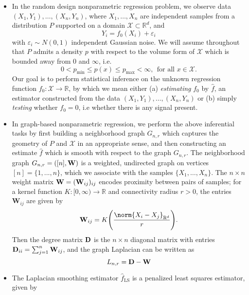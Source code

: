 \documentclass{article}
\newcommand{\Reals}{\mathbb{R}}
\newcommand{\1}{\mathbf{1}}
\newcommand{\Rd}{\Reals^d}
\newcommand{\Lap}{L}
\newcommand{\Xset}{\mathcal{X}}
\newcommand{\mc}[1]{\mathcal{#1}}
\newcommand{\wh}[1]{\widehat{#1}}
\newcommand{\LS}{\mathrm{LS}}
\theoremstyle{alden}
\theoremstyle{aldenthm}
\theoremstyle{definition}
\theoremstyle{remark}
\begin{document}
\begin{itemize}
	\item In the random design nonparametric regression problem, we observe data $(X_1,Y_1),\ldots,(X_n,Y_n)$, where $X_1,\ldots,X_n$ are independent samples from a distribution $P$ supported on a domain $\Xset \subset \Reals^d$, and 
	\begin{equation}
	\label{eqn:random_design_regression}
	Y_i = f_0(X_i) + \varepsilon_i
	\end{equation}
	with $\varepsilon_i \sim N(0,1)$ independent Gaussian noise. We will assume throughout that $P$ admits a density $p$ with respect to the volume form of $\mc{X}$ which is bounded away from $0$ and $\infty$, i.e.
	\begin{equation*}
	0 < p_{\min} \leq p(x) \leq p_{\max} < \infty,~~\textrm{for all $x \in \Xset$.}
	\end{equation*}
	Our goal is to perform statistical inference on the unknown regression function $f_0: \Xset \to \Reals$, by which we mean either (a) \emph{estimating} $f_0$ by $\wh{f}$, an estimator constructed from the data $(X_1,Y_1),\ldots,(X_n,Y_n)$ or (b) simply \emph{testing} whether $f_0 = 0$, i.e whether there is any signal present. 
	\item In graph-based nonparametric regression, we perform the above inferential tasks by first building a neighborhood graph $G_{n,r}$ which captures the geometry of $P$ and $\mc{X}$ in an appropriate sense, and then constructing an estimate $\wh{f}$ which is smooth with respect to the graph $G_{n,r}$. The neighborhood graph $G_{n,r} = ([n],{\bf W})$ is a weighted, undirected graph on vertices $[n] = \{1,...,n\}$, which we associate with the samples $\{X_1,\ldots,X_n\}$. The $n \times n$ weight matrix ${\bf W} = ({\bf W}_{ij})_{ij}$ encodes proximity between pairs of samples; for a kernel function $K: [0,\infty) \to \Reals$ and connectivity radius $r > 0$, the entries $\mathbf{W}_{ij}$ are given by
	\begin{equation*}
	\label{eqn:neighborhood_graph}
	{\bf W}_{ij} = K\Biggl(\frac{\norm{X_i - X_j}_{\Rd}}{r}\Biggr).
	\end{equation*}
	Then the degree matrix ${\bf D}$ is the $n \times n$ diagonal matrix with entries ${\bf D}_{ii} = \sum_{j = 1}^{n}{\bf W}_{ij}$, and the graph Laplacian can be written as
	\begin{equation}
	\label{eqn:graph_Laplacian}
	\Lap_{n,r} = \bf{D} - \bf{W}
	\end{equation}
	\item The Laplacian smoothing estimator $\wh{f}_{\LS}$ \citep{smola2003} is a penalized least squares estimator, given by

\end{itemize}
\end{document}

